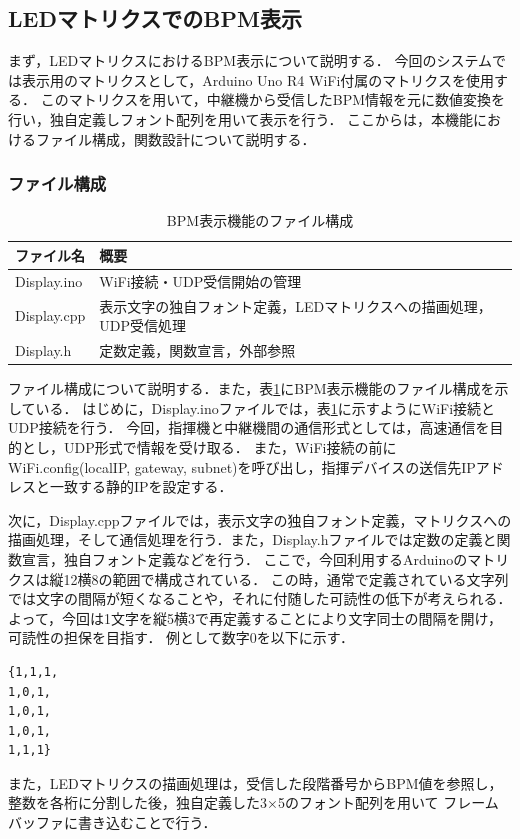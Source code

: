\documentclass[lualatex,article,paper=a4paper,jafontsize=11.5pt,jafontscale=1.05]{jlreq}
\begin{document}
\subsection{LEDマトリクスでのBPM表示}
まず，LEDマトリクスにおけるBPM表示について説明する．
今回のシステムでは表示用のマトリクスとして，Arduino Uno R4 WiFi付属のマトリクスを使用する．
このマトリクスを用いて，中継機から受信したBPM情報を元に数値変換を行い，独自定義しフォント配列を用いて表示を行う．
ここからは，本機能におけるファイル構成，関数設計について説明する．






\subsubsection{ファイル構成}
\begin{table}[h]
    \vspace{-1em}
    \caption{BPM表示機能のファイル構成}
    \centering
    \label{tab:file1}
    \begin{tabular}{ll}
    \hline
    \textbf{ファイル名} & \textbf{概要}\\
    \hline
    Display.ino & WiFi接続・UDP受信開始の管理\\
    \hline
    Display.cpp & 表示文字の独自フォント定義，LEDマトリクスへの描画処理，UDP受信処理\\
    \hline
    Display.h & 定数定義，関数宣言，外部参照\\
    \hline
    \end{tabular}
\end{table}




ファイル構成について説明する．また，表\ref{tab:file1}にBPM表示機能のファイル構成を示している．
はじめに，Display.inoファイルでは，表\ref{tab:file1}に示すようにWiFi接続とUDP接続を行う．
今回，指揮機と中継機間の通信形式としては，高速通信を目的とし，UDP形式で情報を受け取る．
また，WiFi接続の前にWiFi.config(localIP, gateway, subnet)を呼び出し，指揮デバイスの送信先IPアドレスと一致する静的IPを設定する．\par
次に，Display.cppファイルでは，表示文字の独自フォント定義，マトリクスへの描画処理，そして通信処理を行う．また，Display.hファイルでは定数の定義と関数宣言，独自フォント定義などを行う．
ここで，今回利用するArduinoのマトリクスは縦12横8の範囲で構成されている．
この時，通常で定義されている文字列では文字の間隔が短くなることや，それに付随した可読性の低下が考えられる．
よって，今回は1文字を縦5横3で再定義することにより文字同士の間隔を開け，可読性の担保を目指す．
例として数字0を以下に示す．
\begin{verbatim}
{1,1,1,
1,0,1,
1,0,1,
1,0,1,
1,1,1}
\end{verbatim}
また，LEDマトリクスの描画処理は，受信した段階番号からBPM値を参照し，整数を各桁に分割した後，独自定義した3×5のフォント配列を用いて
フレームバッファに書き込むことで行う．
\end{document}
